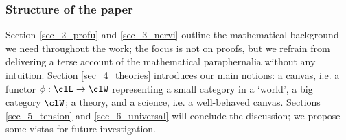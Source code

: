 \subsubsection*{Structure of the paper}
Section \ref{sec_2_profu} and \ref{sec_3_nervi} outline the mathematical background we need throughout the work; the focus is not on proofs, but we refrain from delivering a terse account of the mathematical paraphernalia without any intuition. Section \ref{sec_4_theories} introduces our main notions: a canvas, i.e. a functor $\phi : \clL \to \clW$ representing a small category in a `world', a big category $\clW$; a theory, and a science, i.e. a well-behaved canvas. Sections \ref{sec_5_tension} and \ref{sec_6_universal} will conclude the discussion; we propose some vistas for future investigation.